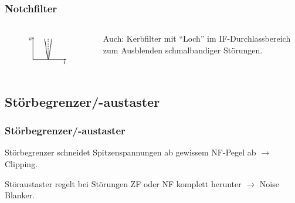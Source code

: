 \begin{frame}
  \frametitle{Notchfilter}

  \begin{columns}
    \begin{center}
      \begin{figure}
        \includegraphics[width=\textwidth,height=.8\textheight,keepaspectratio]{a18/TF326a.png}
      \end{figure}
    \end{center}

    Auch: Kerbfilter mit ``Loch'' im IF-Durchlassbereich zum Ausblenden
    schmalbandiger Störungen.

  \end{columns}


\end{frame}

\subsection{Störbegrenzer/-austaster}

\begin{frame}
  \frametitle{Störbegrenzer/-austaster}

  Störbegrenzer schneidet Spitzenspannungen ab gewissem NF-Pegel ab
  $\rightarrow$ Clipping.

  \bigskip

  Störaustaster regelt bei Störungen ZF oder NF komplett herunter
  $\rightarrow$ Noise Blanker.


\end{frame}


